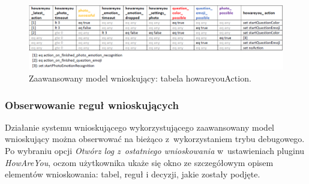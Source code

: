 \begin{figure}[H]
	\centering
	\includegraphics[scale=0.75]{rozdzial4/HMR_howareyouAction.png}
	\caption{Zaawansowany model wnioskujący: tabela howareyouAction.}
\end{figure}


\subsubsection{Obserwowanie reguł wnioskujących}

Działanie systemu wnioskującego wykorzystującego zaawansowany model wnioskujący można obserwować na bieżąco z~wykorzystaniem trybu debugowego. Po wybraniu opcji \textit{Otwórz log z~ostatniego wnioskowania} w~ustawieniach pluginu \textit{HowAreYou}, oczom użytkownika ukaże się okno ze szczegółowym opisem elementów wnioskowania: tabel, reguł i decyzji, jakie zostały podjęte.

